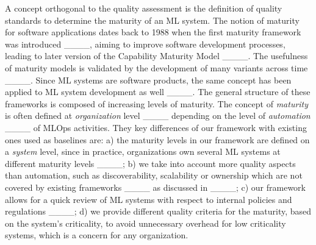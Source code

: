 %
%
A concept orthogonal to the quality assessment is the definition of quality standards to determine the maturity of an ML system. The notion of maturity for software applications dates back to 1988 when the first maturity framework was introduced ____, aiming to improve software development processes, leading to later version of the Capability Maturity Model ____.
The usefulness of maturity models is validated by the development of many variants across time ____. Since ML systems are software products, the same concept has been applied to ML system development as well ____. The general structure of these frameworks is composed of increasing levels of maturity. The concept of \textit{maturity} is often defined at \textit{organization} level ____ depending on the level of \textit{automation} ____ of MLOps activities.
They key differences of our framework with existing ones used as baselines are: a) the maturity levels in our framework are defined on a \textit{system} level, since in practice, organizations own several ML systems at different maturity levels ____; b) we take into account more quality aspects than automation, such as discoverability, scalability or ownership which are not covered by existing frameworks ____ as discussed in ____; c) our framework allows for a quick review of ML systems with respect to internal policies and regulations ____; d) we provide different quality criteria for the maturity, based on the system’s criticality, to avoid unnecessary overhead for low criticality systems, which is a concern for any organization.



